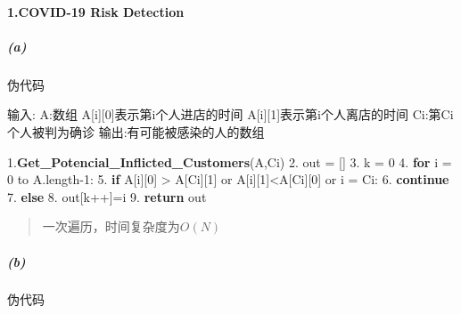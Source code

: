 \documentclass[
]{ctexart}
\author{}
\date{}
\newenvironment{Shaded}{}{}
\newcommand{\ControlFlowTok}[1]{\textcolor[rgb]{0.00,0.44,0.13}{\textbf{#1}}}
\newcommand{\DecValTok}[1]{\textcolor[rgb]{0.25,0.63,0.44}{#1}}
\newcommand{\ErrorTok}[1]{\textcolor[rgb]{1.00,0.00,0.00}{\textbf{#1}}}
\newcommand{\FloatTok}[1]{\textcolor[rgb]{0.25,0.63,0.44}{#1}}
\newcommand{\NormalTok}[1]{#1}
\begin{document}
\hypertarget{header-n0}{%
\paragraph{1.COVID-19 Risk Detection}\label{header-n0}}

\hypertarget{header-n2}{%
\subparagraph{(a)}\label{header-n2}}

伪代码

\begin{Shaded}
\begin{Highlighting}[]
\NormalTok{输入:}
\NormalTok{A:数组}
\NormalTok{  A[i][}\DecValTok{0}\NormalTok{]表示第i个人进店的时间}
\NormalTok{  A[i][}\DecValTok{1}\NormalTok{]表示第i个人离店的时间}
\NormalTok{Ci:第Ci个人被判为确诊}
\NormalTok{输出:有可能被感染的人的数组}
  
\FloatTok{1.}\ErrorTok{Get\_Potencial\_Inflicted\_Customers}\NormalTok{(A,Ci)}
\FloatTok{2.}\NormalTok{	out = []}
\FloatTok{3.}\NormalTok{  k = }\DecValTok{0} 
\FloatTok{4.}  \ControlFlowTok{for}\NormalTok{ i = }\DecValTok{0}\NormalTok{ to A.length{-}}\DecValTok{1}\NormalTok{:}
\FloatTok{5.}    \ControlFlowTok{if}\NormalTok{ A[i][}\DecValTok{0}\NormalTok{] \textgreater{} A[Ci][}\DecValTok{1}\NormalTok{] or A[i][}\DecValTok{1}\NormalTok{]\textless{}A[Ci][}\DecValTok{0}\NormalTok{] or i = Ci:}
\FloatTok{6.}       \ControlFlowTok{continue}
\FloatTok{7.}    \ControlFlowTok{else}
\FloatTok{8.}\NormalTok{       out[k++]=i}
\FloatTok{9.}  \ControlFlowTok{return}\NormalTok{ out}
\end{Highlighting}
\end{Shaded}

\begin{quote}
一次遍历，时间复杂度为\(O(N)\)
\end{quote}

\hypertarget{header-n7}{%
\subparagraph{(b)}\label{header-n7}}

伪代码
\end{document}

